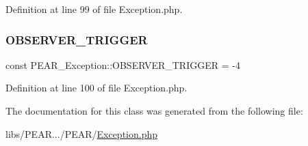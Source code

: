 Definition at line 99 of file Exception.\+php.

\hypertarget{classPEAR__Exception_a0bf6d43a80c7f3bc2c7cfae062ff4477}{}\label{classPEAR__Exception_a0bf6d43a80c7f3bc2c7cfae062ff4477} 
\subsubsection{\texorpdfstring{O\+B\+S\+E\+R\+V\+E\+R\+\_\+\+T\+R\+I\+G\+G\+ER}{OBSERVER\_TRIGGER}}
{\footnotesize\ttfamily const P\+E\+A\+R\+\_\+\+Exception\+::\+O\+B\+S\+E\+R\+V\+E\+R\+\_\+\+T\+R\+I\+G\+G\+ER = -\/4}



Definition at line 100 of file Exception.\+php.



The documentation for this class was generated from the following file\+:\begin{DoxyCompactItemize}
\item 
libs/\+P\+E\+A\+R.../\+P\+E\+A\+R/\hyperlink{PEAR_2Exception_8php}{Exception.\+php}\end{DoxyCompactItemize}
